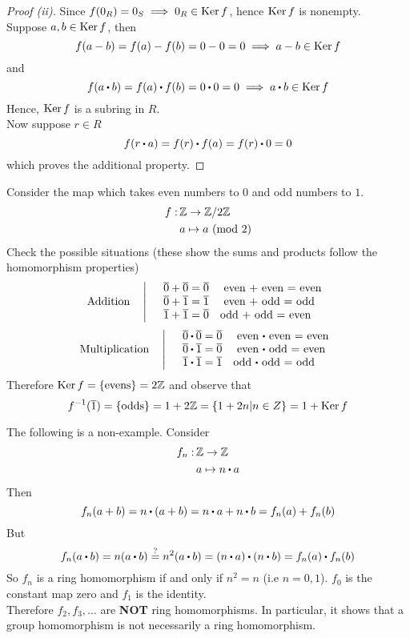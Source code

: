 \documentclass[../Main.tex]{subfiles}
\begin{document}
	\begin{proof}[Proof (ii)]
	Since $f(0_R)=0_S \implies 0_R \in \operatorname{Ker} f$, hence $\operatorname{Ker} f$ is nonempty.\\
	Suppose $a,b\in \operatorname{Ker} f$, then
	\[f(a-b) = f(a)-f(b)=0-0=0 \implies a-b \in \operatorname{Ker} f\]
	and
	\[f(a\rdot b) = f(a)\rdot f(b) = 0\rdot 0 = 0 \implies a\rdot b \in \Ker f\]
	Hence, $\operatorname{Ker} f$ is a subring in $R$.\\
	Now suppose $r\in R$
	\[f(r\rdot a)=f(r)\rdot f(a)=f(r)\rdot 0=0\]
	which proves the additional property.
\end{proof}
\begin{example}
	Consider the map which takes even numbers to $0$ and odd numbers to $1$.
	\begin{align*}
		f: \,&\mathbb{Z} \to \mathbb{Z}/2\mathbb{Z}\\
		&a \mapsto a \ (\mathrm{mod}\ 2)
	\end{align*}
	Check the possible situations (these show the sums and products follow the homomorphism properties)
	\begin{equation*}
	\text{Addition}  \quad \left|\quad\begin{array}{>$l<$}
	$\obar{0}+ \obar{0} = \obar{0}$ \quad
	even $+ $ even = even\\
	$\obar{0}+ \obar{1}= \obar{1}$ \quad
	even $+ $ odd = odd\\
	$\obar{1}+ \obar{1} = \obar{0}$\quad
	odd $+ $ odd = even
	\end{array}\right.
	\end{equation*}
	\begin{equation*}
	\text{Multiplication} \quad \left|\quad\begin{array}{>$l<$}
	$\obar{0}\rdot \obar{0} = \obar{0}$ \quad
	even $\rdot $ even = even\\
	$\obar{0}\rdot \obar{1}= \obar{0}$ \quad
	even $\rdot $ odd = even\\
	$\obar{1}\rdot \obar{1} = \obar{1}$\quad
	odd $\rdot $ odd = odd
	\end{array}\right.
	\end{equation*}
	Therefore $\operatorname{Ker} f = \{\text{evens}\} = 2\mathbb{Z}$ and observe that
	\[f^{-1}(\overline{1}) = \{ \text{odds}\} = 1+2\mathbb{Z} = \{1+2n | n\in Z\} = 1+\operatorname{Ker} f\]
\end{example}
\begin{example}
	The following is a non-example. Consider
	\begin{align*}
		f_n:\,& \Z \to \Z \\
		&a \mapsto n\rdot a
	\end{align*}
	Then
	\[f_n(a+b)=n\rdot (a+b)=n\rdot a+n\rdot b= f_n(a)+f_n(b)\]
	But 
	\[f_n(a\rdot b)=n(a\rdot b) \stackrel{?}{=} n^2(a\rdot b)=(n\rdot a)\rdot (n\rdot b)=f_n(a)\rdot f_n(b)\]
	So $f_n$ is a ring homomorphism if and only if $n^2=n$ (i.e $n=0,1$). $f_0$ is the constant map zero and $f_1$ is the identity.\\
	Therefore $f_2,f_3,\dots $ are \textbf{NOT} ring homomorphisms. In particular, it shows that a group homomorphism is not necessarily a ring homomorphism.
\end{example}
\end{document}
